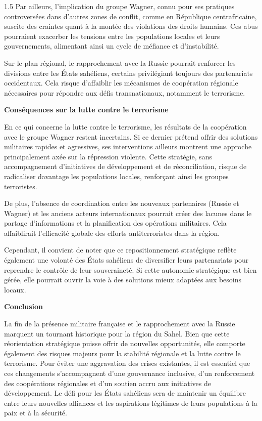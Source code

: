 \documentclass[12pt]{article}
\begin{document}
\begin{spacing}{1.5}
Par ailleurs, l’implication du groupe Wagner, connu pour ses pratiques controversées dans d’autres zones de conflit, comme en République centrafricaine, suscite des craintes quant à la montée des violations des droits humains. Ces abus pourraient exacerber les tensions entre les populations locales et leurs gouvernements, alimentant ainsi un cycle de méfiance et d’instabilité.

Sur le plan régional, le rapprochement avec la Russie pourrait renforcer les divisions entre les États sahéliens, certains privilégiant toujours des partenariats occidentaux. Cela risque d'affaiblir les mécanismes de coopération régionale nécessaires pour répondre aux défis transnationaux, notamment le terrorisme.

\quad

\textbf{Conséquences sur la lutte contre le terrorisme}

En ce qui concerne la lutte contre le terrorisme, les résultats de la coopération avec le groupe Wagner restent incertains. Si ce dernier prétend offrir des solutions militaires rapides et agressives, ses interventions ailleurs montrent une approche principalement axée sur la répression violente. Cette stratégie, sans accompagnement d’initiatives de développement et de réconciliation, risque de radicaliser davantage les populations locales, renforçant ainsi les groupes terroristes.

De plus, l’absence de coordination entre les nouveaux partenaires (Russie et Wagner) et les anciens acteurs internationaux pourrait créer des lacunes dans le partage d’informations et la planification des opérations militaires. Cela affaiblirait l’efficacité globale des efforts antiterroristes dans la région.

Cependant, il convient de noter que ce repositionnement stratégique reflète également une volonté des États sahéliens de diversifier leurs partenariats pour reprendre le contrôle de leur souveraineté. Si cette autonomie stratégique est bien gérée, elle pourrait ouvrir la voie à des solutions mieux adaptées aux besoins locaux.

\quad

\textbf{Conclusion}

La fin de la présence militaire française et le rapprochement avec la Russie marquent un tournant historique pour la région du Sahel. Bien que cette réorientation stratégique puisse offrir de nouvelles opportunités, elle comporte également des risques majeurs pour la stabilité régionale et la lutte contre le terrorisme. Pour éviter une aggravation des crises existantes, il est essentiel que ces changements s'accompagnent d'une gouvernance inclusive, d'un renforcement des coopérations régionales et d'un soutien accru aux initiatives de développement. Le défi pour les États sahéliens sera de maintenir un équilibre entre leurs nouvelles alliances et les aspirations légitimes de leurs populations à la paix et à la sécurité.








\end{spacing}
\end{document}
